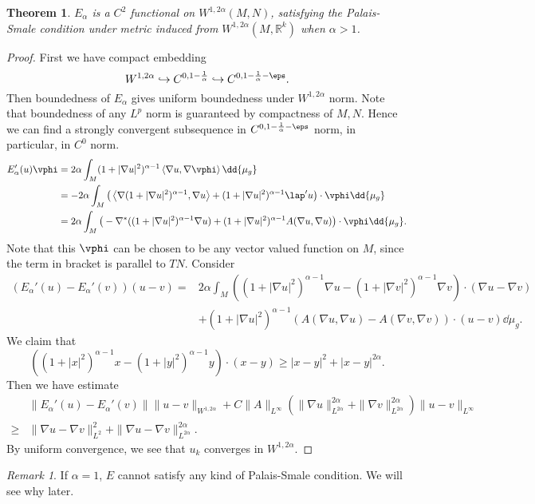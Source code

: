 \documentclass[UTF8,12pt]{article}
\theoremstyle{plain}\newtheorem{theorem}{Theorem}
\theoremstyle{definition}\newtheorem{definition}[theorem]{Definition}
\theoremstyle{definition}\newtheorem{example}[theorem]{Example}
\theoremstyle{plain}\newtheorem{axiom}[theorem]{Axiom}
\theoremstyle{plain}\newtheorem{assertion}[theorem]{Assertion}
\theoremstyle{plain}\newtheorem{corollary}[theorem]{Corollary}
\theoremstyle{plain}\newtheorem{lemma}[theorem]{Lemma}
\theoremstyle{plain}\newtheorem{proposition}[theorem]{Proposition}
\theoremstyle{plain}\newtheorem{prop}[theorem]{Proposition}
\theoremstyle{plain}\newtheorem{conjecture}[theorem]{Conjecture}
\theoremstyle{plain}\newtheorem{conj}[theorem]{Conjecture}
\theoremstyle{plain}\newtheorem{problem}[theorem]{Problem}
\theoremstyle{remark}\newtheorem{notation}[theorem]{Notation}
\theoremstyle{definition}\newtheorem*{question}{Question}
\theoremstyle{definition}\newtheorem*{answer}{Answer}
\theoremstyle{definition}\newtheorem*{goal}{Goal}
\theoremstyle{plain}\newtheorem*{application}{Application}
\theoremstyle{plain}\newtheorem*{exercise}{Exercise}
\theoremstyle{remark}\newtheorem*{remark}{Remark}
\theoremstyle{remark}\newtheorem*{note}{\small{Note}}
\numberwithin{equation}{section}
\numberwithin{theorem}{section}
\numberwithin{figure}{section}
\begin{document}
\begin{theorem}
    \(E_\alpha\) is a \(C^2\) functional on \(W^{1,2\alpha}(M,N)\), satisfying the
    Palais-Smale condition under metric induced from \(W^{1,2\alpha}(M,\mathbb{R}^k)\)
    when \(\alpha>1\).
\end{theorem}
\begin{proof}
    First we have compact embedding \[
        W^{1,2\alpha}\hookrightarrow{} C^{0,1-\frac{1}{\alpha}}
        \hookrightarrow C^{0,1-\frac{1}{\alpha}-\eps}
    .\] Then boundedness of \(E_\alpha\) gives uniform boundedness under
    \(W^{1,2\alpha}\) norm. Note that boundedness of any \(L^p\) norm is guaranteed by
    compactness of \(M,N\). Hence we can find a strongly convergent subsequence in
    \(C^{0,1-\frac{1}{\alpha}-\eps}\) norm, in particular, in \(C^0\) norm.
    \begin{align*}
        E_\alpha'(u)\vphi&=2\alpha\int_{M}(1+|\nabla u|^2)^{\alpha-1}
        \left<\nabla u,\nabla\vphi\right> \dd{\mu_g}\\
        &=-2\alpha\int_{M}\big(\left<\nabla(1+|\nabla u|^2)^{\alpha-1},\nabla u\right>
        +(1+|\nabla u|^2)^{\alpha-1}\lap' u\big)\cdot\vphi\dd{\mu_g} \\
        &=2\alpha\int_{M}\big(-\nabla^*((1+|\nabla u|^2)^{\alpha-1}\nabla u)
        +(1+|\nabla u|^2)^{\alpha-1}A(\nabla u,\nabla u)\big)\cdot\vphi\dd{\mu_g}
    .\end{align*}
    Note that this \(\vphi\) can be chosen to be any vector valued function on \(M\),
    since the term in bracket is parallel to \(TN\). Consider
    \begin{align*}
        (E_\alpha'(u)-E_\alpha'(v))(u-v)=&2\alpha\int_{M}
        ((1+|\nabla u|^2)^{\alpha-1}\nabla u-(1+|\nabla v|^2)^{\alpha-1}\nabla v)
        \cdot (\nabla u-\nabla v) \\
        &+(1+|\nabla u|^2)^{\alpha-1}(A(\nabla u,\nabla u)-A(\nabla v,\nabla v))
        \cdot (u-v)\dd{\mu_g}
    .\end{align*}
    We claim that \[
        ((1+|x|^2)^{\alpha-1}x-(1+|y|^2)^{\alpha-1}y)\cdot (x-y)
        \ge |x-y|^2+|x-y|^{2\alpha}
    .\] Then we have estimate 
    \begin{align*}
        &\|E_\alpha'(u)-E_\alpha'(v)\|\|u-v\|_{W^{1,2\alpha}}
        +C\|A\|_{L^\infty}(\|\nabla u\|_{L^{2\alpha}}^{2\alpha}
        +\|\nabla v\|_{L^{2\alpha}}^{2\alpha})\|u-v\|_{L^\infty} \\
        \ge &\|\nabla u-\nabla v\|_{L^2}^2
        +\|\nabla u-\nabla v\|_{L^{2\alpha}}^{2\alpha}
    .\end{align*}
    By uniform convergence, we see that \(u_k\) converges in \(W^{1,2\alpha}\).
\end{proof}
\begin{remark}
    If \(\alpha=1\), \(E\) cannot satisfy any kind of Palais-Smale condition.
    We will see why later.
\end{remark}
\end{document}

